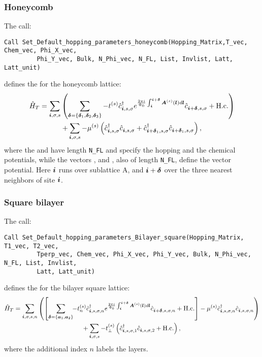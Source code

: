 \subsubsection*{Honeycomb}
The call: 
\begin{lstlisting}[style=fortran]
Call Set_Default_hopping_parameters_honeycomb(Hopping_Matrix,T_vec, Chem_vec, Phi_X_vec,
         Phi_Y_vec, Bulk, N_Phi_vec, N_FL, List, Invlist, Latt, Latt_unit)
\end{lstlisting}
defines  the   for the  honeycomb lattice: 
\begin{multline}
\hat{H}_T  =  \sum_{\boldsymbol{i}, \sigma, s}  \left(  \sum_{ \boldsymbol{\delta} = \left\{ \boldsymbol{\delta}_1, \boldsymbol{\delta}_2, \boldsymbol{\delta}_3\right\} }    - t^{(s)} \hat{c}^{\dagger}_{\boldsymbol{i},s,\sigma}   e^{\frac{2 \pi i}{\Phi_0} \int_{\boldsymbol{i}}^{\boldsymbol{i}+ \boldsymbol{\delta}}  \boldsymbol{A}^{(s)}(\boldsymbol{l})  d \boldsymbol{l}}   \hat{c}^{}_{\boldsymbol{i} + \boldsymbol{\delta},s,\sigma} +  \mathrm{H.c.} \right)   \\   
    +  \sum_{\boldsymbol{i}, \sigma, s}   -  \mu^{(s)} \left( \hat{c}^{\dagger}_{\boldsymbol{i},s,\sigma} \hat{c}^{}_{\boldsymbol{i},s,\sigma}   +  \hat{c}^{\dagger}_{\boldsymbol{i} + \boldsymbol{\delta}_1,s,\sigma} \hat{c}^{}_{\boldsymbol{i} + \boldsymbol{\delta}_1,s,\sigma}   \right),
\end{multline}
where the  and  have  length \texttt{N\_FL} and specify the hopping and the chemical potentials, while the  vectors ,   and ,  also of  length  \texttt{N\_FL}, define the vector potential.  Here $\boldsymbol{i}$  runs over  sublattice  A, and $\boldsymbol{i} + \boldsymbol{\delta}$  over the three nearest neighbors of site $\boldsymbol{i}$.


\subsubsection*{Square bilayer}
The call:
\begin{lstlisting}[style=fortran]
Call Set_Default_hopping_parameters_Bilayer_square(Hopping_Matrix, T1_vec, T2_vec,
         Tperp_vec, Chem_vec, Phi_X_vec, Phi_Y_vec, Bulk, N_Phi_vec, N_FL, List, Invlist,
         Latt, Latt_unit)
\end{lstlisting}  
defines  the   for the  bilayer  square  lattice:       
\begin{multline}
\hat{H}_T  =    \sum_{\boldsymbol{i}, \sigma, s,n } \left(    \left[  \sum_{ \boldsymbol{\delta} = \left\{ \boldsymbol{a}_1, \boldsymbol{a}_2\right\} } \!\! - t_n^{(s)} \hat{c}^{\dagger}_{\boldsymbol{i},s,\sigma,n}   e^{\frac{2 \pi i}{\Phi_0} \int_{\boldsymbol{i}}^{\boldsymbol{i}+ \boldsymbol{\delta}}  \boldsymbol{A}^{(s)}(\boldsymbol{l})  d \boldsymbol{l}}   \hat{c}^{}_{\boldsymbol{i} + \boldsymbol{\delta},s,\sigma,n} +  \mathrm{H.c.} \right]       -  \mu^{(s)} \hat{c}^{\dagger}_{\boldsymbol{i},s,\sigma,n} \hat{c}^{}_{\boldsymbol{i},s,\sigma,n}  \right)   \\
     + \sum_{\boldsymbol{i}, \sigma, s } -  t_{\perp}^{(s)}  \left( \hat{c}^{\dagger}_{\boldsymbol{i},s,\sigma,1} \hat{c}^{}_{\boldsymbol{i},s,\sigma,2}  + \mathrm{H.c.} \right), 
\end{multline}
where the additional  index  $n$  labels the layers.


